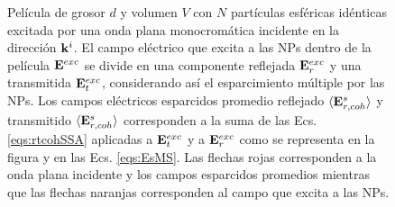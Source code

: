 \begin{figure}[h!]
		\caption{ Película de grosor $d$ y volumen $V$ con $N$ partículas esféricas idénticas excitada por una onda plana monocromática incidente en la dirección $\vb{k}^i$. El campo eléctrico que excita a las NPs dentro de la película $\vb{E}^{exc}$ se divide en una componente reflejada $ \vb{E}^{exc}_r$ y una transmitida $ \vb{E}^{exc}_t$, considerando así el esparcimiento múltiple por las NPs. Los campos eléctricos esparcidos promedio reflejado $\langle \vb{E}^s_{r,coh}\rangle$ y transmitido $\langle \vb{E}^s_{r,coh}\rangle$ corresponden a la suma  de las Ecs. \eqref{eqs:rtcohSSA} aplicadas a $\vb{E}^{exc}_t$ y a $\vb{E}^{exc}_r$ como se representa en la figura y en las Ecs. \eqref{eqs:EsMS}. Las flechas rojas corresponden a la onda plana incidente y los campos esparcidos promedios mientras que las flechas naranjas corresponden al campo que excita a las NPs. }\label{fig:MScatt-slab-MS}
	\end{figure}	
	
